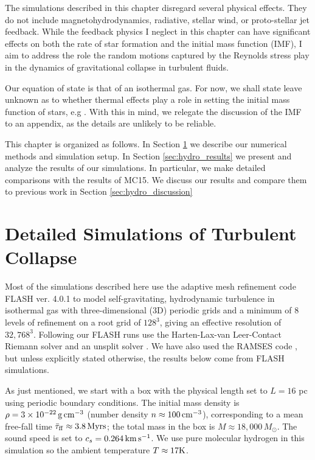 \documentclass[../dissertation.tex]{subfiles}
\begin{document}
The simulations described in this chapter disregard several physical effects.
They do not include magnetohydrodynamics, radiative, stellar wind, or proto-stellar jet feedback.
While the feedback physics I neglect in this chapter can have significant effects on both the rate of star formation and the initial mass function (IMF), I aim to address the role the random motions captured by the Reynolds stress play in the dynamics of gravitational collapse in turbulent fluids.

Our equation of state is that of an isothermal gas. 
For now, we shall state leave unknown as to whether thermal effects play a role in setting the initial mass function of stars, e.g \citet{2005MNRAS.359..211L}.
With this in mind, we relegate the discussion of the IMF to an appendix, as the details are unlikely to be reliable.

This chapter is organized as follows. In Section \ref{sec:hydro_simulation setup}
we describe our numerical methods and simulation setup. In Section
\ref{sec:hydro_results} we present and analyze the results of our simulations. 
In particular, we make detailed comparisons with the results of MC15.  
We discuss our results and compare
them to previous work in Section \ref{sec:hydro_discussion}


\section{Detailed Simulations of Turbulent Collapse} \label{sec:hydro_simulation setup}

Most of the simulations described here use the adaptive mesh refinement code FLASH ver. 4.0.1 
\citep{2000ApJS..131..273F, 2008ASPC..385..145D} to model self-gravitating, hydrodynamic turbulence in isothermal gas with three-dimensional (3D) periodic grids and a minimum of 8 levels of refinement on a root grid of $128^3$, 
giving an effective resolution of $32,768^3$.  
Following \citet{2015ApJ...800...49L} our FLASH runs use the Harten-Lax-van Leer-Contact 
Riemann solver and an unsplit solver \citep{2009ASPC..406..243L}. We have also used the RAMSES code \citep{2002A&A...385..337T}, but unless explicitly stated otherwise, the results below come from FLASH simulations.

As just mentioned, we start with a box with the physical length set to $L = 16$ pc using 
periodic boundary conditions. The initial mass density is 
$\rho = 3\times10^{-22}\,{\rm g\,cm}^{-3}$ (number density $n \approx 100\,{\rm cm}^{-3}$), 
corresponding to a mean 
free-fall time $\bar\tau_{\rm ff}\approx3.8\,{\rm Myrs}$; the total mass in the
box is $M\approx 18,000\,M_\odot$.
The sound speed is set to $c_s = 0.264\,{\rm km\,s^{-1}}$.
We use pure molecular hydrogen in this simulation so the ambient 
temperature $T \approx 17 {\rm K}$.
\end{document}
